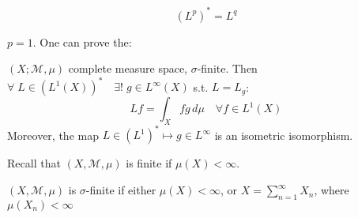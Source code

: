\[
    (L^p)^* = L^{{q}}
\]

\begin{remark}
    \(p=1\). One can prove the:
\end{remark}
\begin{theorem}
    \((X; \mathcal{M}, \mu)\) complete measure space, \(\sigma\)-finite.
    Then \(\forall\; L \in (L^1(X))^* \quad \exists! \; g \in L^\infty(X)\) s.t. \(L=L_g\):
    \[
        Lf = \int_X fg \, d\mu \quad \forall f \in L^1(X)
    \]
    Moreover, the map \(L \in (L^1)^* \mapsto g \in L^\infty\) is an isometric isomorphism.
\end{theorem}

Recall that \((X, \mathcal{M}, \mu)\) is finite if \(\mu(X) < \infty\).

\begin{definition}
    \((X, \mathcal{M}, \mu)\) is \(\sigma\)-finite if either \(\mu(X) < \infty\), or \(X = \sum_{n=1}^\infty X_n\), where \(\mu(X_n) < \infty\)
\end{definition}